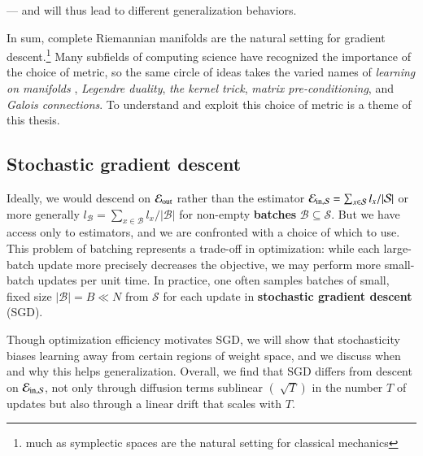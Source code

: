 \documentclass[openany, notitlepage, justified]{tufte-book}
\theoremstyle{plain}
\theoremstyle{definition}
\newcommand{\Bb}{\mathcal{B}}
\newcommand{\Ss}{\mathcal{S}}
\begin{document}
        \noindent
        --- and will thus lead to different generalization behaviors. 

        In sum, complete Riemannian manifolds are the natural
        setting for gradient descent.\footnote{
            much as symplectic spaces are the natural setting for classical
            mechanics
        }
        Many subfields of computing science have recognized the importance
        of the choice of metric,
        so the same circle of ideas takes the varied names of \emph{learning on
        manifolds} \citep{bo13}, \emph{Legendre duality}, \emph{the kernel
        trick}, \emph{matrix pre-conditioning}, and \emph{Galois
        connections}.
        To understand and exploit this choice of metric is a theme of this
        thesis. 

        \subsection{Stochastic gradient descent}

            Ideally, we would descend on $\mathcal{E}_{\text{out}}$ rather than the estimator
            $\Ein = \sum_{x\in\Ss} l_x/|\Ss|$ or more generally $l_\Bb =
            \sum_{x\in\Bb} l_x/|\Bb|$ for non-empty \textbf{batches}
            $\Bb\subseteq\Ss$.  But we have access only to estimators, and we
            are confronted with a choice of which to use.  This problem
            of batching represents a trade-off in optimization: while
            each large-batch update more precisely decreases the objective, we
            may perform more small-batch updates per unit time.  In practice,
            one often samples batches of small, fixed size $|\Bb|=B \ll N$ from
            $\Ss$ for each update in \textbf{stochastic gradient descent}
            (SGD).

            Though optimization efficiency motivates SGD, we will show that
            stochasticity biases learning away from certain regions of weight
            space, and we discuss when and why this helps generalization.
            Overall, we find that SGD differs from descent on $\Ein$, not only
            through diffusion terms sublinear $(\sqrt[]{T})$ in the number $T$
            of updates but also through a linear drift that scales with $T$.
\end{document}
